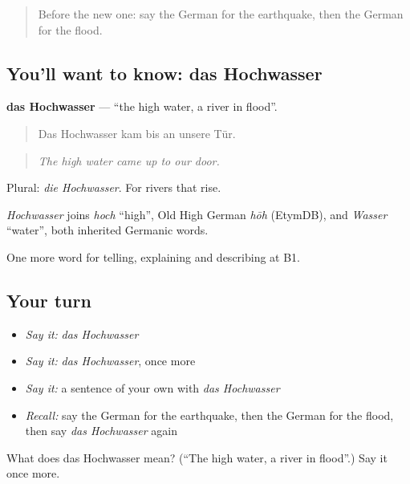 \begin{quote}
Before the new one: say the German for the earthquake, then the German for the flood.
\end{quote}

\subsection*{You'll want to know: das Hochwasser}
\textbf{das Hochwasser} — \textquotedblleft{}the high water, a river in flood\textquotedblright{}.

\begin{quote}
Das Hochwasser kam bis an unsere Tür.
\end{quote}

\begin{quote}
\emph{The high water came up to our door.}
\end{quote}

Plural: \emph{die Hochwasser}. For rivers that rise.

\begin{cousinweb}
\emph{Hochwasser} joins \emph{hoch} \textquotedblleft{}high\textquotedblright{}, Old High German \emph{hōh} (EtymDB), and \emph{Wasser} \textquotedblleft{}water\textquotedblright{}, both inherited Germanic words.
\end{cousinweb}

\begin{grammarlens}[title={What you've built}]
One more word for telling, explaining and describing at B1.
\end{grammarlens}

\subsection*{Your turn}
\begin{itemize}
\raggedright
  \item \emph{Say it:} \emph{das Hochwasser}
  \item \emph{Say it:} \emph{das Hochwasser}, once more
  \item \emph{Say it:} a sentence of your own with \emph{das Hochwasser}
  \item \emph{Recall:} say the German for the earthquake, then the German for the flood, then say \emph{das Hochwasser} again
\end{itemize}

\begin{tcolorbox}[breakable,colback=teal!4,colframe=teal!35!black,title={Before you move on}]
What does das Hochwasser mean? (\textquotedblleft{}The high water, a river in flood\textquotedblright{}.) Say it once more.
\end{tcolorbox}
